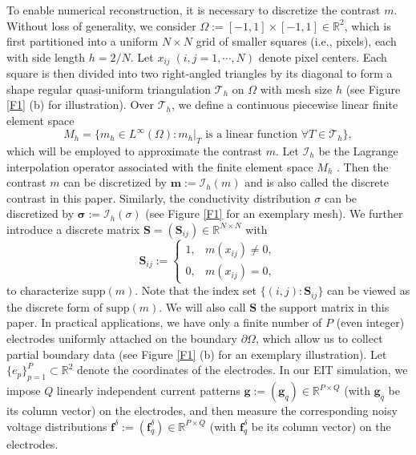 \documentclass[11pt]{article}
\newcommand{\R}{{\mathbb R}}
\newcommand{\pa}{\partial}
\newcommand{\bds}[1]{\boldsymbol{#1}}
\begin{document}
To enable numerical reconstruction, it is necessary to discretize the contrast $ m $. 
Without loss of generality, we consider $ \Omega:=[-1,1]\times [-1,1]\in \R^2 $, which is first partitioned into a uniform $ N\times N $ grid of smaller squares (i.e., pixels), each with side length $ h=2/N $.
Let $ x_{ij}\;(i,j = 1,\cdots,N) $ denote pixel centers.
Each square is then divided into two right-angled triangles by its diagonal to form a shape regular quasi-uniform triangulation $ \mathcal{T}_h $ on $\Omega$ with mesh size $ h $ (see Figure \ref{F1} (b) for illustration).
Over $\mathcal{T}_h$, we define a continuous piecewise linear finite element space
\begin{equation}\label{28}
M_h = \{m_h\in L^\infty(\Omega): m_h|_T \text{ is a linear function } \forall T\in \mathcal{T}_h\},
\end{equation}
which will be employed to approximate the contrast $ m $.
Let $ \mathcal{I}_h $ be the Lagrange interpolation operator associated with the finite element space $ M_h $ \cite{EAG04}.
Then the contrast $ m $ can be discretized by $ \bds{m} := \mathcal{I}_h(m) $ and is also called the discrete contrast in this paper.
Similarly, the conductivity distribution $\sigma$ can be discretized by $ \bds{\sigma} := \mathcal{I}_h(\sigma) $ (see Figure \ref{F1} for an exemplary mesh).
We further introduce a discrete matrix $ \bds{S} = (\bds{S}_{ij})\in\R^{N\times N} $ with
\begin{equation}\label{211}
\bds{S}_{ij} :=
\left\{ \begin{array}{ll}
1, &  m(x_{ij})\neq 0,\\
0, &  m(x_{ij}) = 0,
\end{array} \right.
\end{equation}
to characterize $ \mathrm{supp}(m) $.
Note that the index set $ \{(i,j): \bds{S}_{ij}\} $ can be viewed as the discrete form of $ \mathrm{supp}(m) $.
We will also call $ \bds{S} $ the support matrix in this paper. 
In practical applications, we have only a finite number of $ P $ (even integer) electrodes uniformly attached on the boundary $ \pa \Omega $, which allow us to collect partial boundary data (see Figure \ref{F1} (b) for an exemplary illustration).
Let $ \{e_p\}_{p=1}^P\subset\R^2 $ denote the coordinates of the electrodes.
In our EIT simulation, we impose $ Q $ linearly independent current patterns $ \bds{g} :=(\bds{g}_q)\in\R^{P\times Q} $ (with $ \bds{g}_q $ be its column vector) on the electrodes, and then measure the corresponding noisy voltage distributions $ \bds{f}^\delta := (\bds{f}_q^\delta)\in\R^{P\times Q} $ (with $ \bds{f}_q^\delta $ be its column vector) on the electrodes.
\end{document}
